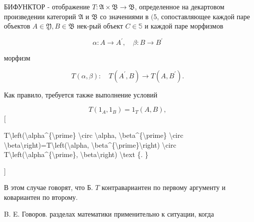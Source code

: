 \documentclass[10pt]{article}
\begin{document}
БИФУНКТОР - отображение $T: \mathfrak{A} \times \mathfrak{B} \rightarrow \mathfrak{B}$, определенное на декартовом произведении категорий $\mathfrak{A}$ и $\mathfrak{B}$ со значениями в $(5$, сопоставляющее каждой паре объектов $A \in \mathfrak{Y}, B \in \mathfrak{B}$ нек-рый объект $C \in \mathbb{5}$ и каждой паре морфизмов



\[

\alpha: A \rightarrow A^{\prime}, \quad \beta: B \rightarrow B^{\prime}

\]



морфизм



\[

T(\alpha, \beta): \quad T\left(A^{\prime}, B\right) \rightarrow T\left(A, B^{\prime}\right) .

\]



Как правило, требуется также выполнение условий



\[

T\left(1_{A}, 1_{B}\right)=1_{T}(A, B),

\][



T\textbackslash left(\textbackslash alpha\^{}\{\textbackslash prime\} \textbackslash circ \textbackslash alpha, \textbackslash beta\^{}\{\textbackslash prime\} \textbackslash circ \textbackslash beta\textbackslash right)=T\textbackslash left(\textbackslash alpha, \textbackslash beta\^{}\{\textbackslash prime\}\textbackslash right) \textbackslash circ T\textbackslash left(\textbackslash alpha\^{}\{\textbackslash prime\}, \textbackslash beta\textbackslash right) \textbackslash text \{. \}

]



В этом случае говорят, что Б. $T$ контравариантен по первому аргументу и ковариантен по второму.



B. E. Говоров. разделах математики применительно к ситуации, когда
\end{document}

